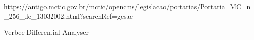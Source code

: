 \documentclass[
12pt,		%
openright,	%
twoside,  %
a4paper,			%
chapter=TITLE,		%
english,			%
french,				%
spanish,			%
brazil				%
]{USPSC-classe/USPSC}
\begin{document}
\begin{flushleft}
\begin{flushleft}
\begin{flushleft}
\begin{flushleft}
\begin{flushleft}
\begin{flushleft}
\begin{flushleft}
\begin{flushleft}
\begin{flushleft}
[BRASIL, 2002] https://antigo.mctic.gov.br/mctic/opencms/legislacao/portarias/Portaria\_MC\_n\_256\_de\_13032002.html?searchRef=gesac
\end{flushleft}


\end{flushleft}


\end{flushleft}


\end{flushleft}


\end{flushleft}


\end{flushleft}


\end{flushleft}


\end{flushleft}


\end{flushleft}


\begin{flushleft}
\begin{flushleft}
\begin{flushleft}
\begin{flushleft}
\begin{flushleft}
\begin{flushleft}
\begin{flushleft}
\begin{flushleft}
\begin{flushleft}
[BRITANNICA, 2022] Verbee Differential Analyser
\end{flushleft}


\end{flushleft}


\end{flushleft}


\end{flushleft}


\end{flushleft}


\end{flushleft}


\end{flushleft}


\end{flushleft}


\end{flushleft}
\end{document}

